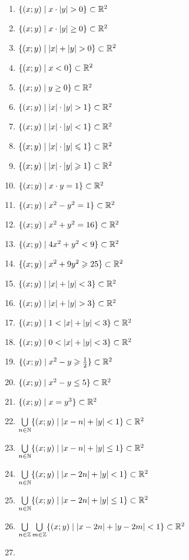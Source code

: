 \begin{enumerate}
	\item
		$\{(x;y) \mid x\cdot |y| > 0\}\subset\mathbb{R}^2$
	\item
		$\{(x;y) \mid x\cdot |y| \ge 0\}\subset\mathbb{R}^2$
	\item
		$\{(x;y) \mid |x| + |y| > 0\}\subset\mathbb{R}^2$
	\item
		$\{(x;y) \mid x < 0\}\subset\mathbb{R}^2$
	\item
		$\{(x;y) \mid y \ge 0\}\subset\mathbb{R}^2$
	\item
		$\{(x;y) \mid |x|\cdot |y| > 1\}\subset\mathbb{R}^2$
	\item
		$\{(x;y) \mid |x|\cdot |y| < 1\}\subset\mathbb{R}^2$
	\item
		$\{(x;y) \mid |x|\cdot |y| \leqslant 1\}\subset\mathbb{R}^2$
	\item
		$\{(x;y) \mid |x|\cdot |y| \geqslant 1\}\subset\mathbb{R}^2$
	\item
		$\{(x;y) \mid x\cdot y = 1\}\subset\mathbb{R}^2$
	\item
		$\{(x;y) \mid x^2 - y^2 = 1\}\subset\mathbb{R}^2$
	\item
		$\{(x;y) \mid x^2 + y^2 = 16\}\subset\mathbb{R}^2$
	\item
		$\{(x;y) \mid 4x^2 + y^2 < 9\}\subset\mathbb{R}^2$
	\item
		$\{(x;y) \mid x^2 + 9y^2 \geqslant 25\}\subset\mathbb{R}^2$
	\item
		$\{(x;y) \mid |x| + |y| < 3\}\subset\mathbb{R}^2$
	\item
		$\{(x;y) \mid |x| + |y| > 3\}\subset\mathbb{R}^2$
	\item
		$\{(x;y) \mid 1 < |x| + |y| < 3 \}\subset\mathbb{R}^2$
	\item
		$\{(x;y) \mid 0 < |x| + |y| < 3 \}\subset\mathbb{R}^2$
	\item
		$\{(x;y) \mid x^2 - y \geqslant \frac12\}\subset\mathbb{R}^2$
	\item
		$\{(x;y) \mid x^2 - y \le 5\}\subset\mathbb{R}^2$
	\item
		$\{(x;y) \mid x = y^3\}\subset\mathbb{R}^2$
	\item
		$\bigcup\limits_{n\in\mathbb{N}}\{(x;y) \mid |x-n| + |y| < 1\}\subset\mathbb{R}^2$
	\item
		$\bigcup\limits_{n\in\mathbb{N}}\{(x;y) \mid |x-n| + |y| \le 1\}\subset\mathbb{R}^2$
	\item
		$\bigcup\limits_{n\in\mathbb{N}}\{(x;y) \mid |x-2n| + |y| < 1\}\subset\mathbb{R}^2$
	\item
		$\bigcup\limits_{n\in\mathbb{N}}\{(x;y) \mid |x-2n| + |y| \le 1\}\subset\mathbb{R}^2$
	\item
		$\bigcup\limits_{n\in\mathbb{Z}}\bigcup\limits_{m\in\mathbb{Z}}\{(x;y) \mid |x-2n| + |y-2m| < 1\}\subset\mathbb{R}^2$
	\item

\end{enumerate}
